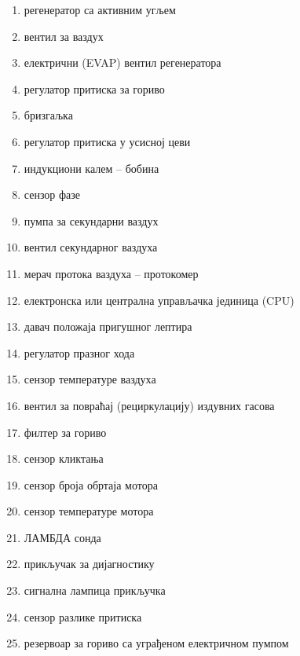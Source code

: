 \documentclass{report}
\begin{document}
\begin{kljucno}
    \begin{enumerate}
    \item регенератор са активним угљем
    \item вентил за ваздух
    \item електрични (EVAP) вентил регенератора
    \item регулатор притиска за гориво
    \item бризгаљка
    \item регулатор притиска у усисној цеви
    \item индукциони калем -- бобина
    \item сензор фазе
    \item пумпа за секундарни ваздух
    \item вентил секундарног ваздуха
    \item мерач протока ваздуха -- протокомер
    \item електронска или централна управљачка јединица (CPU)
    \item давач положаја пригушног лептира
    \item регулатор празног хода
    \item сензор температуре ваздуха
    \item вентил за повраћај (рециркулацију) издувних гасова
    \item филтер за гориво
    \item сензор кликтања
    \item сензор броја обртаја мотора
    \item сензор температуре мотора
    \item ЛАМБДА сонда
    \item прикључак за дијагностику
    \item сигнална лампица прикључка
    \item сензор разлике притиска
    \item резервоар за гориво са уграђеном електричном пумпом
\end{enumerate}
\end{kljucno}
\end{document}
